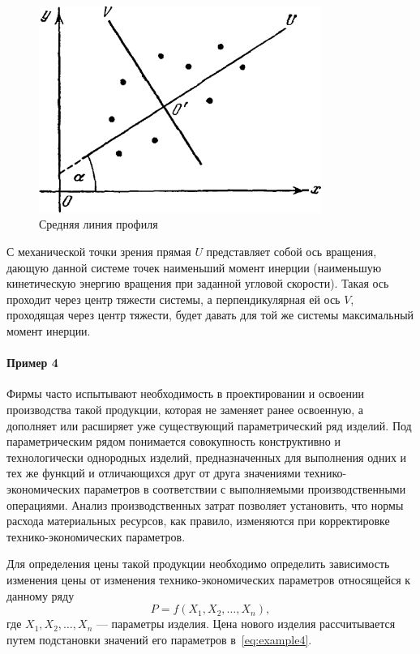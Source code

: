 \begin{figure}[h!]
  \centering
  \includegraphics[width=92mm]{fig/example3}
  \caption{Средняя линия профиля}\label{fig:example3}
\end{figure}

С механической точки зрения прямая \( U \) представляет собой ось вращения,
дающую данной системе точек наименьший момент инерции
(наименьшую кинетическую энергию вращения при заданной угловой скорости).
Такая ось проходит через центр тяжести системы, а перпендикулярная ей ось \( V \),
проходящая через центр тяжести, будет давать для той же системы максимальный момент инерции.

\pagebreak
\paragraph*{Пример 4~\cite{kruchkova02}}

Фирмы часто испытывают необходимость в проектировании и освоении производства такой продукции,
которая не заменяет ранее освоенную, а дополняет или расширяет уже существующий параметрический ряд
изделий. Под параметрическим рядом понимается совокупность конструктивно и
технологически однородных изделий, предназначенных для выполнения одних и тех же функций и
отличающихся друг от друга значениями технико-экономических параметров в соответствии с
выполняемыми производственными операциями.
Анализ производственных затрат позволяет установить, что нормы расхода материальных ресурсов,
как правило, изменяются при корректировке технико-экономических параметров.

Для определения цены такой продукции необходимо определить зависимость изменения цены от
изменения технико-экономических параметров относящейся к данному ряду
\begin{equation}
  \label{eq:example4}
  P = f(X_1, X_2, \ldots, X_n),
\end{equation}
где \( X_1, X_2, \ldots, X_n \) --- параметры изделия.
Цена нового изделия рассчитывается путем подстановки значений его параметров в~\eqref{eq:example4}.

